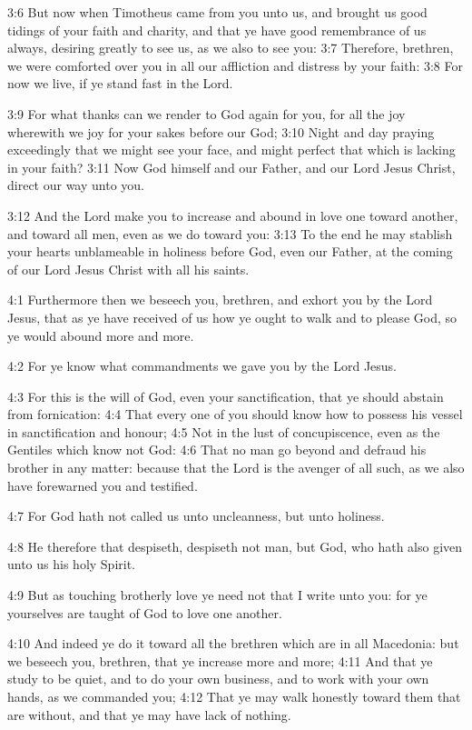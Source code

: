3:6 But now when Timotheus came from you unto us, and brought us good
tidings of your faith and charity, and that ye have good remembrance
of us always, desiring greatly to see us, as we also to see you: 3:7
Therefore, brethren, we were comforted over you in all our affliction
and distress by your faith: 3:8 For now we live, if ye stand fast in
the Lord.

3:9 For what thanks can we render to God again for you, for all the
joy wherewith we joy for your sakes before our God; 3:10 Night and day
praying exceedingly that we might see your face, and might perfect
that which is lacking in your faith?  3:11 Now God himself and our
Father, and our Lord Jesus Christ, direct our way unto you.

3:12 And the Lord make you to increase and abound in love one toward
another, and toward all men, even as we do toward you: 3:13 To the end
he may stablish your hearts unblameable in holiness before God, even
our Father, at the coming of our Lord Jesus Christ with all his
saints.

4:1 Furthermore then we beseech you, brethren, and exhort you by the
Lord Jesus, that as ye have received of us how ye ought to walk and to
please God, so ye would abound more and more.

4:2 For ye know what commandments we gave you by the Lord Jesus.

4:3 For this is the will of God, even your sanctification, that ye
should abstain from fornication: 4:4 That every one of you should know
how to possess his vessel in sanctification and honour; 4:5 Not in the
lust of concupiscence, even as the Gentiles which know not God: 4:6
That no man go beyond and defraud his brother in any matter: because
that the Lord is the avenger of all such, as we also have forewarned
you and testified.

4:7 For God hath not called us unto uncleanness, but unto holiness.

4:8 He therefore that despiseth, despiseth not man, but God, who hath
also given unto us his holy Spirit.

4:9 But as touching brotherly love ye need not that I write unto you:
for ye yourselves are taught of God to love one another.

4:10 And indeed ye do it toward all the brethren which are in all
Macedonia: but we beseech you, brethren, that ye increase more and
more; 4:11 And that ye study to be quiet, and to do your own business,
and to work with your own hands, as we commanded you; 4:12 That ye may
walk honestly toward them that are without, and that ye may have lack
of nothing.

